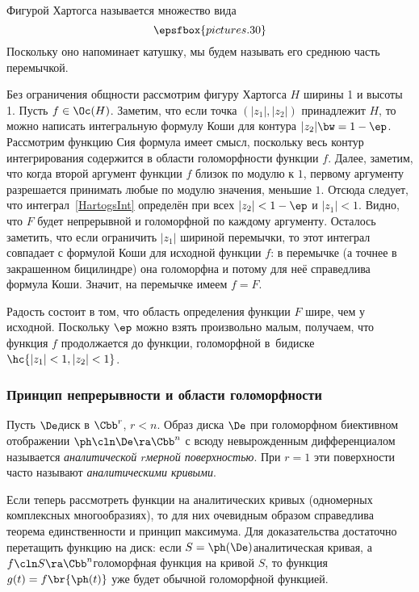 \documentclass[a4paper]{article}
\begin{document}
Фигурой Хартогса называется множество вида
$$\epsfbox{pictures.30}$$
Поскольку оно напоминает катушку, мы будем называть его среднюю часть перемычкой.

Без ограничения общности рассмотрим фигуру Хартогса $H$ ширины 1 и высоты 1. Пусть $f \in \Oc(H)$.
Заметим, что если точка $(|z_1|,|z_2|)$ принадлежит $H$, то можно написать интегральную формулу Коши для
контура $|z_2| \bw= 1-\ep$. Рассмотрим функцию
Сия формула имеет смысл, поскольку весь контур интегрирования содержится в области голоморфности функции $f$.
Далее, заметим, что когда второй аргумент функции $f$ близок по модулю к $1$, первому аргументу разрешается
принимать любые по модулю значения, меньшие $1$. Отсюда следует, что интеграл~\eqref{HartogsInt} определён
при всех $|z_2| < 1 - \ep$ и $|z_1| < 1$. Видно, что $F$ будет непрерывной и голоморфной по каждому аргументу.
Осталось заметить, что если ограничить $|z_1|$ шириной перемычки,
то этот интеграл совпадает с формулой Коши для исходной функции $f$: в перемычке (а точнее в
закрашенном бицилиндре) она голоморфна и потому для неё справедлива формула Коши. Значит, на
перемычке имеем $f = F$.

Радость состоит в том, что область определения функции $F$ шире, чем у исходной. Поскольку $\ep$ можно взять
произвольно малым, получаем, что функция $f$ продолжается до функции, голоморфной в~бидиске
$\hc{|z_1| < 1, |z_2| < 1}$.

\subsubsection{Принцип непрерывности и области голоморфности}

\begin{df}
Пусть $\De$\т диск в $\Cbb^r$, $r < n$. Образ диска $\De$ при голоморфном биективном
отображении $\ph\cln \De \ra \Cbb^n$ с всюду невырожденным дифференциалом называется
\emph{аналитической $r$\д мерной поверхностью}. При $r=1$ эти поверхности
часто называют \emph{аналитическими кривыми}.
\end{df}

Если теперь рассмотреть функции на аналитических кривых (одномерных комплексных многообразиях),
то для них очевидным образом справедлива теорема единственности
и принцип максимума. Для доказательства достаточно перетащить функцию на диск:
если $S = \ph(\De)$\т аналитическая кривая, а $f\cln S\ra \Cbb^n$\т голоморфная функция
на кривой $S$, то функция $g(t) = f\br{\ph(t)}$ уже будет обычной голоморфной функцией.
\end{document}
